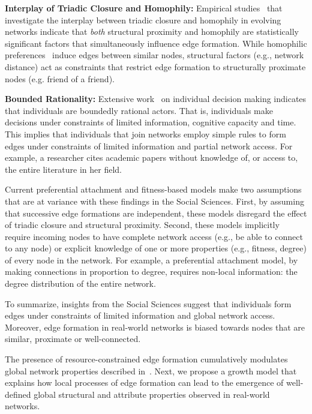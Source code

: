 \textbf{Interplay of Triadic Closure and Homophily:}
Empirical studies~\cite{35626,block2014multidimensional} that investigate the
interplay between triadic closure and homophily in evolving networks indicate
that \textit{both} structural proximity and homophily are statistically
significant factors that simultaneously influence edge formation. While
homophilic preferences~\cite{mcpherson2001birds} induce edges between similar
nodes, structural factors (e.g., network distance) act as constraints that
restrict edge formation to structurally proximate nodes (e.g. friend of a
friend).

\textbf{Bounded Rationality:}
Extensive
work~\cite{simon1972theories,gigerenzer1996reasoning,lipman1995information} on
individual decision making indicates that individuals are boundedly rational
actors. That is, individuals make decisions under constraints of limited
information, cognitive capacity and time. This implies that individuals that
join networks employ simple rules to form edges under constraints of limited
information and partial network access. For example, a researcher cites academic
papers without knowledge of, or access to, the entire literature in her field.

Current preferential attachment and fitness-based models
\cite{dorogovtsev2000structure,kim2017effect,singh2017relay,barabasi1999emergence}
make two assumptions that are at variance with these findings in the Social
Sciences. First, by assuming that successive edge formations are independent,
these models disregard the effect of triadic closure and structural proximity.
Second, these models implicitly require incoming nodes to have complete network
access (e.g., be able to connect to any node) or explicit knowledge of one or
more properties (e.g., fitness, degree) of every node in the network. For
example, a preferential attachment model, by making connections in proportion to
degree, requires non-local information: the degree distribution of the entire
network.

To summarize, insights from the Social Sciences suggest that individuals form
edges under constraints of limited information and global network access.
Moreover, edge formation in real-world networks is biased towards nodes that are
similar, proximate or well-connected.

The presence of resource-constrained edge formation cumulatively modulates global
network properties described in~.
Next, we propose a growth model that explains how local processes of
edge formation can lead to the emergence of well-defined global structural and
attribute properties observed in real-world networks.

